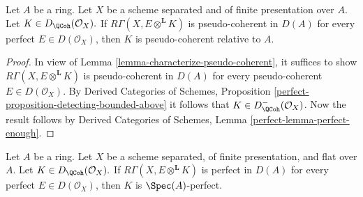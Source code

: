 \begin{lemma}
\label{lemma-characterize-pseudo-coh-improved}
Let $A$ be a ring. Let $X$ be a scheme separated and
of finite presentation over $A$. Let 
$K \in D_\QCoh(\mathcal{O}_X).$ If 
$R \Gamma (X, E \otimes ^{\mathbf{L}} K)$ is
pseudo-coherent in $D(A)$ for every perfect 
$E \in D(\mathcal{O}_X)$, then $K$ is pseudo-coherent
relative to $A$.
\end{lemma}

\begin{proof}
In view of Lemma \ref{lemma-characterize-pseudo-coherent}, it suffices
to show $R \Gamma (X, E \otimes ^{\mathbf{L}} K)$ is
pseudo-coherent in $D(A)$ for every pseudo-coherent 
$E \in D(\mathcal{O}_X)$. By Derived Categories of Schemes,
Proposition \ref{perfect-proposition-detecting-bounded-above}
it follows that $K \in D^-_\QCoh (\mathcal{O}_X)$. Now the
result follows by Derived Categories of Schemes, Lemma
\ref{perfect-lemma-perfect-enough}.
\end{proof}

\begin{lemma}
\label{lemma-characterize-relatively-perfect}
Let $A$ be a ring. Let $X$ be a scheme separated, of
finite presentation, and flat over $A$. Let 
$K \in D_\QCoh(\mathcal{O}_X).$ If 
$R \Gamma (X, E \otimes^\mathbf{L} K)$ is perfect in
$D(A)$ for every perfect $E \in D(\mathcal{O}_X)$, then $K$ is
$\Spec(A)$-perfect.
\end{lemma}

